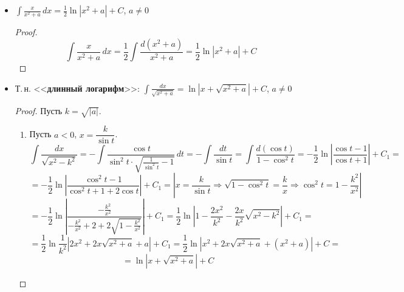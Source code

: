 \begin{itemize}
	\item $\displaystyle \int \frac{x}{x^2 + a}\,dx = \frac12 \ln |x^2 + a| + C$, $a \neq 0$
	\begin{proof}
	\begin{equation*}
	\int \frac{x}{x^2 + a}\,dx =
	\frac12 \int \frac{d(x^2 + a)}{x^2 + a} =
	\frac12 \ln |x^2 + a| + C
	\end{equation*}
	\end{proof}
	
	\item Т.\,н. <<\textbf{длинный логарифм}>>: $\displaystyle \int \frac{dx}{\sqrt{x^2 + a}} = \ln \left| x + \sqrt{x^2 + a} \right| + C$, $a \neq 0$
	\begin{proof}
	Пусть $k = \sqrt{|a|}$.
	\begin{enumerate}
		\item Пусть $a < 0$, $x = \dfrac{k}{\sin t}$.
		\begin{equation*}
		\int \frac{dx}{\sqrt{x^2 - k^2}} =
		-\int \frac{\cos t}{\sin^2 t \cdot \sqrt{\frac1{\sin^2 t} - 1}}\,dt =
		-\int \frac{dt}{\sin t} =
		\int \frac{d(\cos t)}{1 - \cos^2 t} =
		-\frac12 \ln \left| \frac{\cos t - 1}{\cos t + 1} \right| + C_1 =
		\end{equation*}
		\begin{equation*}
		= -\frac12 \ln \left| \frac{\cos^2 t - 1}{\cos^2 t + 1 + 2\cos t} \right| + C_1 =
		\left| x = \frac{k}{\sin t} \Rightarrow
		\sqrt{1 - \cos^2 t} = \frac{k}x \Rightarrow
		\cos^2 t = 1 - \frac{k^2}{x^2} \right|
		\end{equation*}
		\begin{equation*}
		= -\frac12 \ln \left| \frac{-\frac{k^2}{x^2}}{-\frac{k^2}{x^2} + 2 + 2\sqrt{1 - \frac{k^2}{x^2}}} \right| + C_1 =
		\frac12 \ln \left| 1 - \frac{2x^2}{k^2} - \frac{2x}{k^2}\sqrt{x^2 - k^2} \right| + C_1 =
		\end{equation*}
		\begin{equation*}
		= \frac12 \ln \frac1{k^2} \left| 2x^2 + 2x\sqrt{x^2 + a} + a \right| + C_1 =
		\frac12 \ln \left| x^2 + 2x\sqrt{x^2 + a} + (x^2 + a) \right| + C =
		\end{equation*}
		\begin{equation*}
		= \ln \left| x + \sqrt{x^2 + a} \right| + C
		\end{equation*}
		

\end{enumerate}
\end{proof}
\end{itemize}

